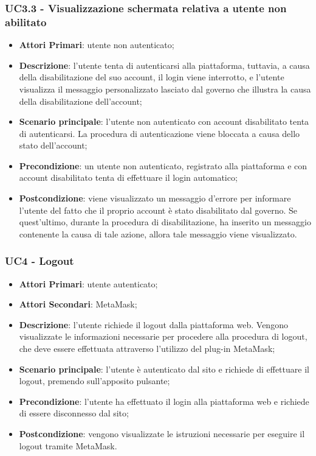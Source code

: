 \subsubsection{UC3.3 - Visualizzazione schermata relativa a utente non abilitato}
\begin{itemize}
	\item \textbf{Attori Primari}: utente non autenticato;
	\item \textbf{Descrizione}:
	l'utente tenta di autenticarsi alla piattaforma, tuttavia, a causa della disabilitazione del suo account, il login viene interrotto, e l'utente visualizza il messaggio personalizzato lasciato dal governo che illustra la causa della disabilitazione dell'account;
	\item \textbf{Scenario principale}:
	l'utente non autenticato con account disabilitato tenta di autenticarsi. La procedura di autenticazione viene bloccata a causa dello stato dell'account;
	\item \textbf{Precondizione}:
	un utente non autenticato, registrato alla piattaforma e con account disabilitato tenta di effettuare il login automatico;
	\item \textbf{Postcondizione}:  viene visualizzato un messaggio d'errore per informare l'utente del fatto che il proprio account è stato disabilitato dal governo. Se quest'ultimo, durante la procedura di disabilitazione, ha inserito un messaggio contenente la causa di tale azione, allora tale messaggio viene visualizzato.
\end{itemize}
\subsubsection{UC4 - Logout}
\begin{itemize}
	\item \textbf{Attori Primari}:
	utente autenticato;
	\item \textbf{Attori Secondari}:
	MetaMask\glo;
	\item \textbf{Descrizione}: l'utente richiede il logout dalla piattaforma web. Vengono visualizzate le informazioni necessarie per procedere alla procedura di logout, che deve essere effettuata attraverso l'utilizzo del plug-in MetaMask\glo;
	\item \textbf{Scenario principale}: l'utente è autenticato dal sito e richiede di effettuare il logout, premendo sull'apposito pulsante;
	\item \textbf{Precondizione}: l'utente ha effettuato il login alla piattaforma web e richiede di essere disconnesso dal sito;
	\item \textbf{Postcondizione}: vengono visualizzate le istruzioni necessarie per eseguire il logout tramite MetaMask\glo. 
\end{itemize}

